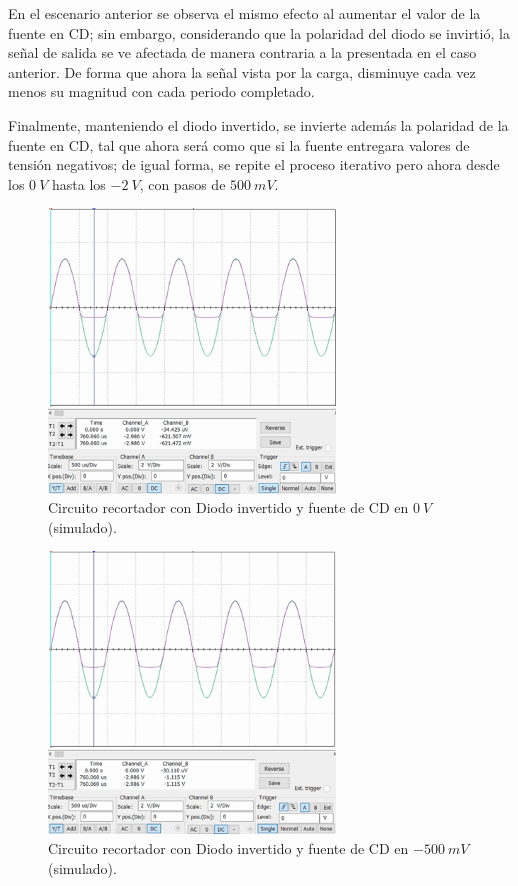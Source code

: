 \documentclass[journal]{IEEEtran}
\begin{document}
En el escenario anterior se observa el mismo efecto al aumentar el valor de la fuente en CD; sin embargo, considerando
que la polaridad del diodo se invirtió, la señal de salida se ve afectada de manera contraria a la presentada en el caso anterior.
De forma que ahora la señal vista por la carga, disminuye cada vez menos su magnitud con cada periodo completado.

Finalmente, manteniendo el diodo invertido, se invierte además la polaridad de la fuente en CD, tal que ahora será como que si la fuente
entregara valores de tensión negativos; de igual forma, se repite el proceso iterativo pero ahora desde los $0~V$ hasta los $-2~V$, con pasos de $500~mV$.
\begin{figure}[H]
        \centering
        \includegraphics[width=3in]{SignalSimulated_15.png}
        \caption{Circuito recortador con Diodo invertido y fuente de CD en $0~V$ (simulado).}
        \label{fig:SignalSimulated_15}
\end{figure}
\begin{figure}[H]
        \centering
        \includegraphics[width=3in]{SignalSimulated_16.png}
        \caption{Circuito recortador con Diodo invertido y fuente de CD en $-500~mV$ (simulado).}
        \label{fig:SignalSimulated_16}
\end{figure}
\end{document}
